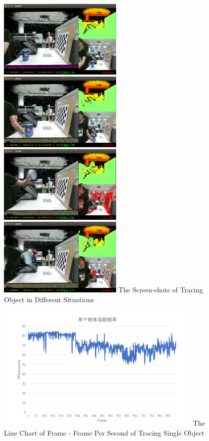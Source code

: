 \begin{figure}[!htp]
  \centering
  \includegraphics[width=6cm]{figure/beforeT.png}
  \hspace{1cm}
    \includegraphics[width=6cm]{figure/noT.png}
    \includegraphics[width=6cm]{figure/staticT.png}
  \hspace{1cm}
  \includegraphics[width=6cm]{figure/movingT.png}
    {The Screen-shots of Tracing Object in Different Situations}
  \label{fig:SRR}
\end{figure}


\begin{figure}[!htp]
  \centering
  \includegraphics[width=10cm]{figure/fps.png}
    {The Line Chart of Frame - Frame Per Second of Tracing Single Object }
 \label{fig:fps}
\end{figure}

